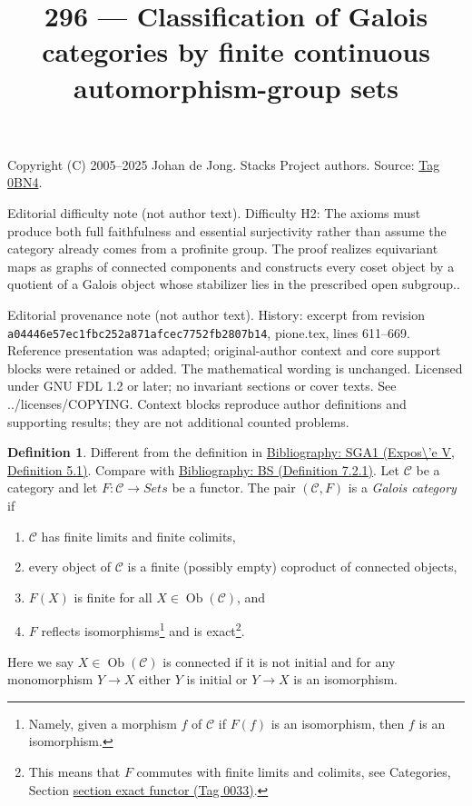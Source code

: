 \documentclass{amsart}
\newenvironment{reference}{\comment}{\endcomment}
\theoremstyle{plain}
\theoremstyle{definition}
\newtheorem{definition}[subsection]{Definition}
\theoremstyle{remark}
\numberwithin{equation}{subsection}
\def\Ob{\mathop{\mathrm{Ob}}\nolimits}
\begin{document}
\title[Stacks Project, Tag 0BN4]{296 --- Classification of Galois categories by finite continuous automorphism-group sets}
\maketitle
\noindent Copyright (C) 2005--2025 Johan de Jong. Stacks Project authors. Source: \href{https://stacks.math.columbia.edu/tag/0BN4}{Tag 0BN4}.

\noindent Editorial difficulty note (not author text). Difficulty H2: The axioms must produce both full faithfulness and essential surjectivity rather than assume the category already comes from a profinite group. The proof realizes equivariant maps as graphs of connected components and constructs every coset object by a quotient of a Galois object whose stabilizer lies in the prescribed open subgroup..

\noindent Editorial provenance note (not author text). History: excerpt from revision \texttt{a0444\allowbreak 6e57e\allowbreak c1fbc\allowbreak 252a8\allowbreak 71afc\allowbreak ec775\allowbreak 2fb28\allowbreak 07b14}, pione.tex, lines 611--669. Reference presentation was adapted; original-author context and core support blocks were retained or added. The mathematical wording is unchanged. Licensed under GNU FDL 1.2 or later; no invariant sections or cover texts. See ../licenses/COPYING. Context blocks reproduce author definitions and supporting results; they are not additional counted problems.

\begin{definition}
\label{definition-galois-category}
\begin{reference}
Different from the definition in \href{https://stacks.math.columbia.edu/bibliography}{Bibliography: SGA1 (Expos\textbackslash{}'e V, Definition 5.1)}.
Compare with \href{https://stacks.math.columbia.edu/bibliography}{Bibliography: BS (Definition 7.2.1)}.
\end{reference}
Let $\mathcal{C}$ be a category and let $F : \mathcal{C} \to \textit{Sets}$
be a functor. The pair $(\mathcal{C}, F)$ is a {\it Galois category} if
\begin{enumerate}
\item $\mathcal{C}$ has finite limits and finite colimits,
\item
\label{item-connected-components}
every object of $\mathcal{C}$ is a finite (possibly empty)
coproduct of connected objects,
\item $F(X)$ is finite for all $X \in \Ob(\mathcal{C})$, and
\item $F$ reflects isomorphisms\footnote{Namely, given a morphism
$f$ of $\mathcal{C}$ if $F(f)$ is an isomorphism, then
$f$ is an isomorphism.} and is exact\footnote{This means that
$F$ commutes with finite limits and colimits, see
Categories, Section \href{https://stacks.math.columbia.edu/tag/0033}{section exact functor (Tag 0033)}.}.
\end{enumerate}
Here we say $X \in \Ob(\mathcal{C})$ is connected if
it is not initial and for any monomorphism $Y \to X$
either $Y$ is initial or $Y \to X$ is an isomorphism.
\end{definition}
\end{document}
